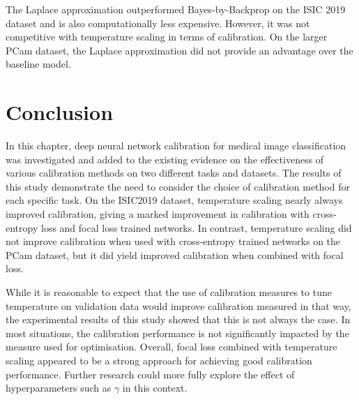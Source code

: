 The Laplace approximation outperformed Bayes-by-Backprop on the ISIC 2019 dataset and is also computationally less expensive. However, it was not competitive with temperature scaling in terms of calibration. On the larger PCam dataset, the Laplace approximation did not provide an advantage over the baseline model.



\section{Conclusion}
\label{sec:calibration_conclusion}
In this chapter, deep neural network calibration for medical image classification was investigated and added to the existing evidence on the effectiveness of various calibration methods on two different tasks and datasets. The results of this study demonstrate the need to consider the choice of calibration method for each specific task. On the ISIC2019 dataset, temperature scaling nearly always improved calibration, giving a marked improvement in calibration with cross-entropy loss and focal loss trained networks. In contrast, temperature scaling did not improve calibration when used with cross-entropy trained networks on the PCam dataset, but it did yield improved calibration when combined with focal loss.

While it is reasonable to expect that the use of calibration measures to tune temperature on validation data would improve calibration measured in that way, the experimental results of this study showed that this is not always the case. In most situations, the calibration performance is not significantly impacted by the measure used for optimisation. Overall, focal loss combined with temperature scaling appeared to be a strong approach for achieving good calibration performance. Further research could more fully explore the effect of hyperparameters such as $\gamma$ in this context.